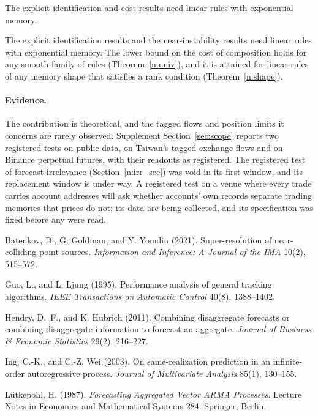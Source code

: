 The explicit identification and cost results need linear rules with exponential memory.

The explicit identification results and the near-instability results need linear rules with exponential memory. The lower bound on the cost of composition holds for any smooth family of rules (Theorem~\ref{n:univ}), and it is attained for linear rules of any memory shape that satisfies a rank condition (Theorem~\ref{n:shape}).

\paragraph{Evidence.} The contribution is theoretical, and the tagged flows and position limits it concerns are rarely observed. Supplement Section~\ref{sec:scope} reports two registered tests on public data, on Taiwan's tagged exchange flows and on Binance perpetual futures, with their readouts as registered. The registered test of forecast irrelevance (Section~\ref{n:irr_sec}) was void in its first window, and its replacement window is under way. A registered test on a venue where every trade carries account addresses will ask whether accounts' own records separate trading memories that prices do not; its data are being collected, and its specification was fixed before any were read.

 Batenkov, D., G. Goldman, and Y. Yomdin (2021). Super-resolution of near-colliding point sources. \emph{Information and Inference: A Journal of the IMA} 10(2), 515--572.

 Guo, L., and L. Ljung (1995). Performance analysis of general tracking algorithms. \emph{IEEE Transactions on Automatic Control} 40(8), 1388--1402.

 Hendry, D.~F., and K. Hubrich (2011). Combining disaggregate forecasts or combining disaggregate information to forecast an aggregate. \emph{Journal of Business \& Economic Statistics} 29(2), 216--227.

 Ing, C.-K., and C.-Z. Wei (2003). On same-realization prediction in an infinite-order autoregressive process. \emph{Journal of Multivariate Analysis} 85(1), 130--155.

 L\"utkepohl, H. (1987). \emph{Forecasting Aggregated Vector ARMA Processes}. Lecture Notes in Economics and Mathematical Systems 284. Springer, Berlin.

